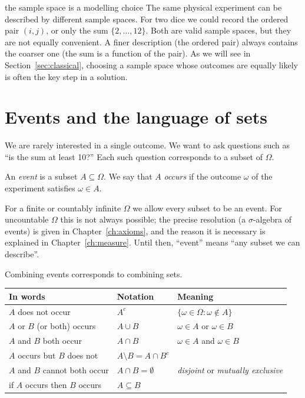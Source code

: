 \begin{nuance}{the sample space is a modelling choice}
The same physical experiment can be described by different sample spaces. For
two dice we could record the ordered pair $(i,j)$, or only the sum
$\{2,\dots,12\}$. Both are valid sample spaces, but they are not equally
convenient. A finer description (the ordered pair) always contains the coarser
one (the sum is a function of the pair). As we will see in
Section~\ref{sec:classical}, choosing a sample space whose outcomes are
equally likely is often the key step in a solution.
\end{nuance}

\section{Events and the language of sets}

We are rarely interested in a single outcome. We want to ask questions such as
``is the sum at least 10?'' Each such question corresponds to a subset of
$\Omega$.

\begin{definition}[Event]
An \emph{event} is a subset $A\subseteq\Omega$. We say that $A$ \emph{occurs}
if the outcome $\omega$ of the experiment satisfies $\omega\in A$.
\end{definition}

For a finite or countably infinite $\Omega$ we allow every subset to be an
event. For uncountable $\Omega$ this is not always possible; the precise
resolution (a $\sigma$-algebra of events) is given in
Chapter~\ref{ch:axioms}, and the reason it is necessary is explained in
Chapter~\ref{ch:measure}. Until then, ``event'' means ``any subset we can describe''.

Combining events corresponds to combining sets.

\begin{center}
\begin{tabular}{@{}lll@{}}
\toprule
In words & Notation & Meaning \\
\midrule
$A$ does not occur & $A^c$ & $\{\omega\in\Omega:\omega\notin A\}$\\
$A$ or $B$ (or both) occurs & $A\cup B$ & $\omega\in A$ or $\omega\in B$\\
$A$ and $B$ both occur & $A\cap B$ & $\omega\in A$ and $\omega\in B$\\
$A$ occurs but $B$ does not & $A\setminus B=A\cap B^c$ & \\
$A$ and $B$ cannot both occur & $A\cap B=\emptyset$ & \emph{disjoint} or \emph{mutually exclusive}\\
if $A$ occurs then $B$ occurs & $A\subseteq B$ & \\
\bottomrule
\end{tabular}
\end{center}

